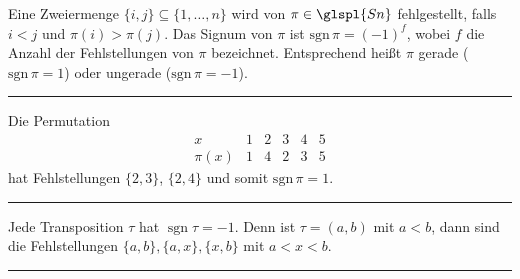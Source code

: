 \documentclass[9pt]{article}
\begin{document}
\begin{defi}
Eine Zweiermenge \( \{i, j\} \subseteq \{1, \ldots, n\} \) wird von \( \pi \in \glspl{Sn} \) fehlgestellt, falls \( i < j \) und \( \pi(i) > \pi(j) \). Das Signum von \( \pi \) ist \( \text{sgn} \, \pi = (-1)^f \), wobei \( f \) die Anzahl der Fehlstellungen von \( \pi \) bezeichnet. Entsprechend heißt \( \pi \) gerade (\( \text{sgn} \, \pi = 1 \)) oder ungerade (\( \text{sgn} \, \pi = -1 \)).  
\end{defi} \noindent \rule{8cm}{0.4pt}

\begin{bsp}
Die Permutation
\[
\begin{array}{c|ccccc}
x & 1 & 2 & 3 & 4 & 5 \\
\hline
\pi(x) & 1 & 4 & 2 & 3 & 5
\end{array}
\]
hat Fehlstellungen \( \{2, 3\} \), \( \{2, 4\} \) und somit \( \text{sgn} \, \pi = 1 \). \\
\end{bsp} \noindent \rule{8cm}{0.4pt}


\begin{bsp}
Jede Transposition $\tau$ hat $\operatorname{sgn} \tau = -1$. Denn ist $\tau = (a, b)$ mit $a < b$, dann sind die Fehlstellungen $\{a, b\}, \{a, x\}, \{x, b\}$ mit $a < x < b$. \\
\end{bsp} \noindent \rule{8cm}{0.4pt}
\end{document}
